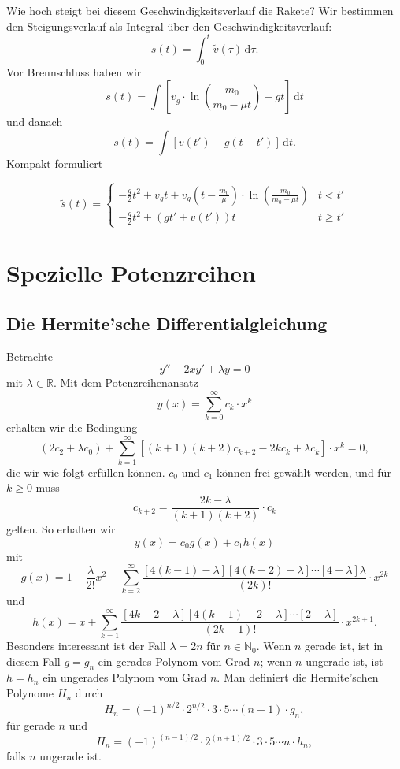 \documentclass[%
11pt,%
twoside,%
titlepage,%
swissgerman,%
headsepline%
]{scrartcl}
\newcommand{\definition}[1]{\colorbox{emerald}{#1}}
\theoremstyle{definition}
\theoremstyle{plain}
\begin{document}
Wie hoch steigt bei diesem Geschwindigkeitsverlauf die Rakete? Wir bestimmen den Steigungsverlauf als Integral über den Geschwindigkeitsverlauf:
$$s(t)=\int_0^t\tilde{v}(\tau)\,\mathrm{d}\tau.$$
Vor Brennschluss haben wir
$$s(t)=\int \left[v_g\cdot\ln\left(\frac{m_0}{m_0-\mu t}\right)-gt\right]\,\mathrm{d}t$$
und danach
$$s(t)=\int \left[v(t')-g(t-t')\right]\,\mathrm{d}t.$$
Kompakt formuliert

$$\tilde{s}(t)=
\begin{cases}
-\frac{g}{2}t^2+v_gt+v_g(t-\frac{m_0}{\mu})\cdot\ln\left(\frac{m_0}{m_0-\mu t}\right)& t<t'\\
-\frac{g}{2}t^2+(gt'+v(t'))t& t\geq t'
\end{cases}
$$

\clearpage

\section{Spezielle Potenzreihen}

\subsection{Die Hermite'sche Differentialgleichung}

Betrachte
\begin{equation}\label{eq:hermit}
y''-2xy'+\lambda y=0
\end{equation}
mit $\lambda\in\mathbb{R}$. Mit dem Potenzreihenansatz
$$y(x)=\sum_{k=0}^\infty c_k\cdot x^k$$
erhalten wir die Bedingung
$$
(2c_2+\lambda c_0)
+\sum_{k=1}^\infty[(k+1)(k+2)c_{k+2}-2kc_k+\lambda c_k]\cdot x^k=0,
$$
die wir wie folgt erfüllen können. $c_0$ und $c_1$ können frei gewählt werden, und für $k\geq0$ muss
$$c_{k+2}=\frac{2k-\lambda}{(k+1)(k+2)}\cdot c_k$$
gelten. So erhalten wir
$$y(x)=c_0g(x)+c_1h(x)$$
mit
$$
g(x)=1-\frac{\lambda}{2!}x^2
-\sum_{k=2}^\infty\frac{[4(k-1)-\lambda][4(k-2)-\lambda]\dotsm[4-\lambda]\lambda}{(2k)!}\cdot x^{2k}
$$
und
$$
h(x)=x
+\sum_{k=1}^\infty\frac{[4k-2-\lambda][4(k-1)-2-\lambda]\dotsm[2-\lambda]}{(2k+1)!}\cdot x^{2k+1}.
$$
Besonders interessant ist der Fall $\lambda=2n$ für $n\in\mathbb{N}_0$. Wenn $n$ gerade ist, ist in diesem Fall $g=g_n$ ein gerades Polynom vom Grad $n$; wenn $n$ ungerade ist, ist $h=h_n$ ein ungerades Polynom vom Grad $n$. Man definiert die \definition{Hermite'schen Polynome} $H_n$ durch
$$H_n=(-1)^{n/2}\cdot2^{n/2}\cdot3\cdot5\dotsm(n-1)\cdot g_n,$$
für gerade $n$ und
$$H_n=(-1)^{(n-1)/2}\cdot2^{(n+1)/2}\cdot3\cdot5\dotsm n\cdot h_n,$$
falls $n$ ungerade ist.
\end{document}
